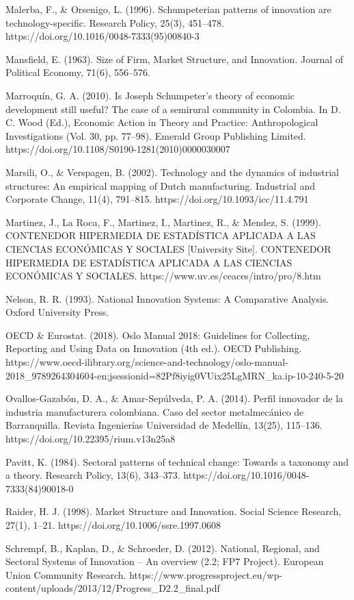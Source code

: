 \documentclass[12pt,a4paper]{article}
\begin{document}
{Malerba, F., \& Orsenigo, L. (1996). Schumpeterian patterns of innovation are technology-specific. Research Policy, 25(3), 451–478. https://doi.org/10.1016/0048-7333(95)00840-3

Mansfield, E. (1963). Size of Firm, Market Structure, and Innovation. Journal of Political Economy, 71(6), 556–576.

Marroquín, G. A. (2010). Is Joseph Schumpeter’s theory of economic development still useful? The case of a semirural community in Colombia. In D. C. Wood (Ed.), Economic Action in Theory and Practice: Anthropological Investigations (Vol. 30, pp. 77–98). Emerald Group Publishing Limited. https://doi.org/10.1108/S0190-1281(2010)0000030007

Marsili, O., \& Verspagen, B. (2002). Technology and the dynamics of industrial structures: An empirical mapping of Dutch manufacturing. Industrial and Corporate Change, 11(4), 791–815. https://doi.org/10.1093/icc/11.4.791

Martinez, J., La Roca, F., Martinez, I., Martinez, R., \& Mendez, S. (1999). CONTENEDOR HIPERMEDIA DE ESTADÍSTICA APLICADA A LAS CIENCIAS ECONÓMICAS Y SOCIALES [University Site]. CONTENEDOR HIPERMEDIA DE ESTADÍSTICA APLICADA A LAS CIENCIAS ECONÓMICAS Y SOCIALES. https://www.uv.es/ceaces/intro/pro/8.htm

Nelson, R. R. (1993). National Innovation Systems: A Comparative Analysis. Oxford University Press.

OECD \& Eurostat. (2018). Oslo Manual 2018: Guidelines for Collecting, Reporting and Using Data on Innovation (4th ed.). OECD Publishing. https://www.oecd-ilibrary.org/science-and-technology/oslo-manual-2018\_9789264304604-en;jsessionid=82Pf8iyig0VUix25LgMRN\_ka.ip-10-240-5-20

Ovallos-Gazabón, D. A., \& Amar-Sepúlveda, P. A. (2014). Perfil innovador de la industria manufacturera colombiana. Caso del sector metalmecánico de Barranquilla. Revista Ingenierías Universidad de Medellín, 13(25), 115–136. https://doi.org/10.22395/rium.v13n25a8

Pavitt, K. (1984). Sectoral patterns of technical change: Towards a taxonomy and a theory. Research Policy, 13(6), 343–373. https://doi.org/10.1016/0048-7333(84)90018-0

Raider, H. J. (1998). Market Structure and Innovation. Social Science Research, 27(1), 1–21. https://doi.org/10.1006/ssre.1997.0608

Schrempf, B., Kaplan, D., \& Schroeder, D. (2012). National, Regional, and Sectoral Systems of Innovation –   An overview (2.2; FP7 Project). European Union Community Research. https://www.progressproject.eu/wp-content/uploads/2013/12/Progress\_D2.2\_final.pdf


}
\end{document}
